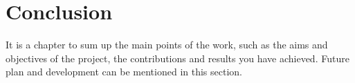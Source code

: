 \section{Conclusion}
It is a chapter to sum up the main points of the work, such as the aims and objectives of the project, the contributions and results you have achieved.  Future plan and development can be mentioned in this section.
